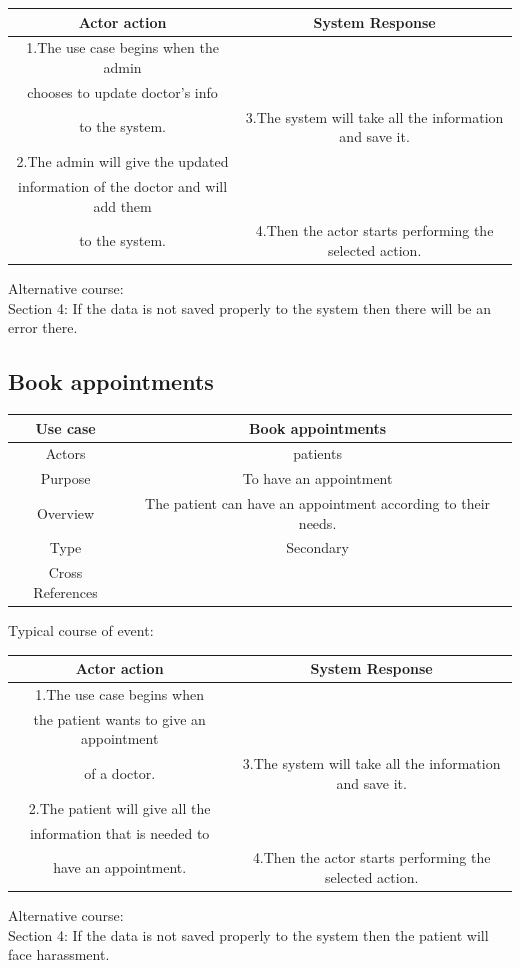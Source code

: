 \documentclass[14pt,a4paper,calibribody]{article}
\begin{document}
\begin{center}
\begin{tabular}{ |c| c| }
\hline
Actor action & System Response \\ 
\hline
1.The use case begins when the admin \\chooses to update doctor’s info\\ to the system. & 3.The system will take all the information and save it.\\  
\hline
2.The admin will give the updated \\information of the doctor and will add them \\to the system. & 4.Then the actor starts performing the selected action. \\  
\hline
\end{tabular}
\end{center}
Alternative course:\\
Section 4: If the data is not saved properly to the system then there will be an error there.



\subsection{Book appointments}
\begin{center}
\begin{tabular}{ |c| c| }
\hline
Use case & Book appointments\\ 
\hline
Actors & patients\\  
\hline
Purpose & To have an appointment\\ 
\hline
Overview & The patient can have an appointment according to their needs. \\ 
\hline
Type & Secondary\\ 
\hline
Cross References &\\ 
\hline
\end{tabular}
\end{center}
Typical course of event:

\begin{center}
\begin{tabular}{| c| c| }
\hline
Actor action & System Response\\ 
\hline
1.The use case begins when\\ the patient wants to give an appointment \\of a doctor. & 3.The system will take all the information and save it. \\  
\hline
2.The patient will give all the\\ information that is needed to \\have an appointment. & 4.Then the actor starts performing the selected action. \\   
\hline
\end{tabular}
\end{center}
Alternative course:\\
Section 4: If the data is not saved properly to the system then the patient will face harassment.
\vspace{0.3in}
\end{document}
